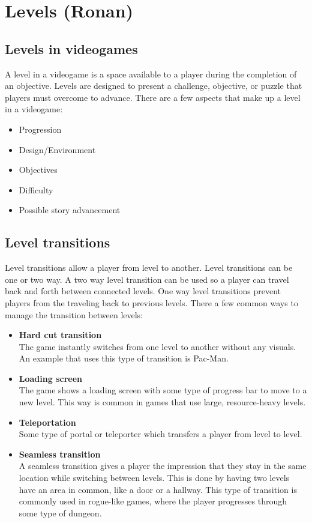 \section{Levels (Ronan)}
\subsection{Levels in videogames}
A level in a videogame is a space available to a player during
the completion of an objective. Levels are designed to present a challenge,
objective, or puzzle that players must overcome to advance.
There are a few aspects that make up a level in a videogame:
\begin{itemize}
    \item Progression
    \item Design/Environment
    \item Objectives
    \item Difficulty
    \item Possible story advancement
\end{itemize}

\subsection{Level transitions}
Level transitions allow a player from level to another.
Level transitions can be one or two way.
A two way level transition can be used so a player can travel back and forth between connected levels.
One way level transitions prevent players from the traveling back to previous levels.
There a few common ways to manage the transition between levels:
\begin {itemize}
\item \textbf{Hard cut transition} \\
The game instantly switches from one level to another without any visuals.
An example that uses this type of transition is Pac-Man.
\item \textbf{Loading screen} \\
The game shows a loading screen with some type of progress bar to move to a new level.
This way is common in games that use large, resource-heavy levels.
\item \textbf{Teleportation} \\
Some type of portal or teleporter which transfers a player from level to level.
\item \textbf{Seamless transition} \\
A seamless transition gives a player the impression that they stay in the same location while switching between levels.
This is done by having two levels have an area in common, like a door or a hallway.
This type of transition is commonly used in rogue-like games, where the player progresses through some type of dungeon.
\end{itemize}

